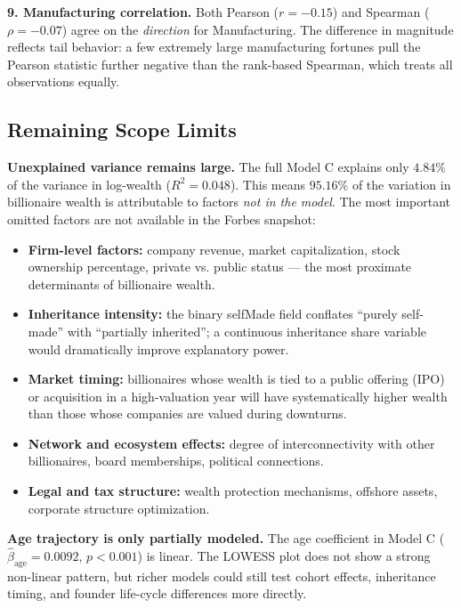 \documentclass[a4paper,10pt]{article}
\begin{document}
\medskip
\noindent\textbf{9. Manufacturing correlation.} Both Pearson ($r=-0.15$) and Spearman ($\rho=-0.07$) agree on the \emph{direction} for Manufacturing. The difference in magnitude reflects tail behavior: a few extremely large manufacturing fortunes pull the Pearson statistic further negative than the rank-based Spearman, which treats all observations equally.

\subsection{Remaining Scope Limits}

\textbf{Unexplained variance remains large.} The full Model C explains only $4.84\%$ of the variance in log-wealth ($R^2=0.048$). This means $95.16\%$ of the variation in billionaire wealth is attributable to factors \emph{not in the model}. The most important omitted factors are not available in the Forbes snapshot:

\begin{itemize}
  \item \textbf{Firm-level factors:} company revenue, market capitalization, stock ownership percentage, private vs. public status --- the most proximate determinants of billionaire wealth.
  \item \textbf{Inheritance intensity:} the binary selfMade field conflates ``purely self-made'' with ``partially inherited''; a continuous inheritance share variable would dramatically improve explanatory power.
  \item \textbf{Market timing:} billionaires whose wealth is tied to a public offering (IPO) or acquisition in a high-valuation year will have systematically higher wealth than those whose companies are valued during downturns.
  \item \textbf{Network and ecosystem effects:} degree of interconnectivity with other billionaires, board memberships, political connections.
  \item \textbf{Legal and tax structure:} wealth protection mechanisms, offshore assets, corporate structure optimization.
\end{itemize}

\medskip

\textbf{Age trajectory is only partially modeled.} The age coefficient in Model C ($\hat\beta_{\text{age}} = 0.0092$, $p < 0.001$) is linear. The LOWESS plot does not show a strong non-linear pattern, but richer models could still test cohort effects, inheritance timing, and founder life-cycle differences more directly.
\end{document}

